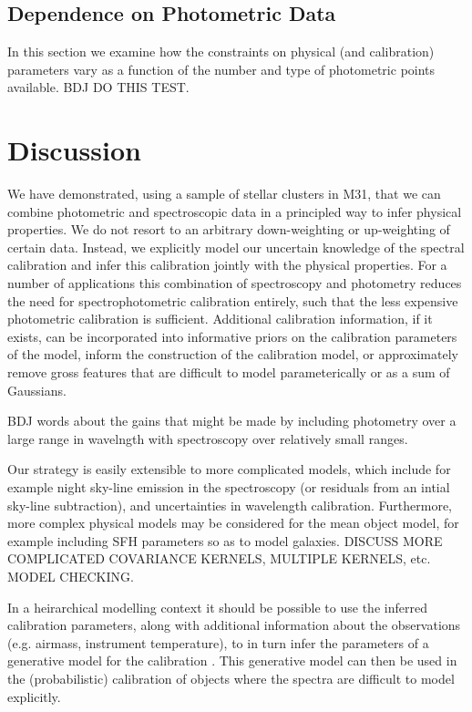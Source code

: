 \documentclass[iop,numberedappendix]{emulateapj}
\begin{document}
\subsection{Dependence on Photometric Data}
In this section we examine how the constraints on physical (and
calibration) parameters vary as a function of the number and type of
photometric points available. {\color{red} BDJ DO THIS TEST.}

\section{Discussion}

We have demonstrated, using a sample of stellar clusters in M31, that
we can combine photometric and spectroscopic data in a principled way
to infer physical properties.  We do not resort to an arbitrary
down-weighting or up-weighting of certain data. Instead, we explicitly
model our uncertain knowledge of the spectral calibration and infer
this calibration jointly with the physical properties. For a number of
applications this combination of spectroscopy and photometry reduces
the need for spectrophotometric calibration entirely, such that the less
expensive photometric calibration is sufficient.  Additional calibration
information, if it exists, can be incorporated into informative priors
on the calibration parameters of the model, inform the construction
of the calibration model, or approximately remove gross features
that are difficult to model parameterically or as a sum of Gaussians.

{\color{blue} BDJ words about the gains that might be made by
including photometry over a large range in wavelngth with spectroscopy
over relatively small ranges.}

Our strategy is easily extensible to more complicated models, which
include for example night sky-line emission in the spectroscopy (or
residuals from an intial sky-line subtraction), and uncertainties in
wavelength calibration. Furthermore, more complex physical models may
be considered for the mean object model, for example including SFH
parameters so as to model galaxies.  {\color{blue} DISCUSS MORE
COMPLICATED COVARIANCE KERNELS, MULTIPLE KERNELS, etc.  MODEL
CHECKING.}

In a heirarchical modelling context it should be possible to use the
inferred calibration parameters, along with additional information
about the observations (e.g. airmass, instrument temperature), to in
turn infer the parameters of a generative model for the calibration
\citep[e.g.][]{spectrophot}. This generative model can then be used in
the (probabilistic) calibration of objects where the spectra are
difficult to model explicitly.
\end{document}
